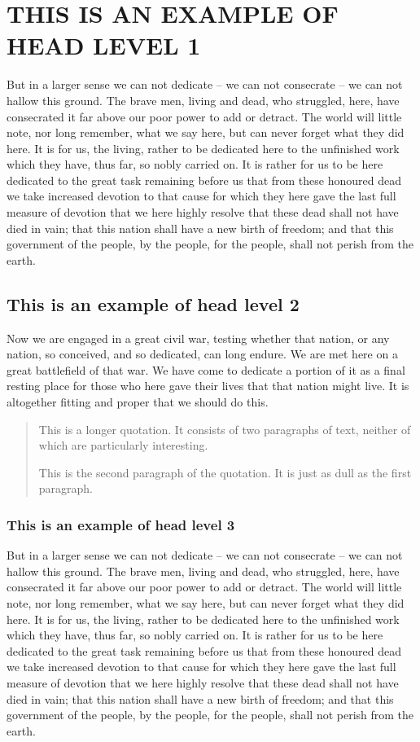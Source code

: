 \documentclass{pasa}%
\begin{document}
 
\section{THIS IS AN EXAMPLE OF HEAD LEVEL 1}
But in a larger sense we can not dedicate -- we can not consecrate -- we can not hallow this ground. The brave men, living and dead, who struggled, here, have consecrated it far above our poor power to add or detract. The world will little note, nor long remember, what we say here, but can never forget what they did here. It is for us, the living, rather to be dedicated here to the unfinished work which they have, thus far, so nobly carried on. It is rather for us to be here dedicated to the great task remaining before us  that from these honoured dead we take increased devotion to that cause for which they here gave the last full measure of devotion  that we here highly resolve that these dead shall not have died in vain; that this nation shall have a new birth of freedom; and that this government of the people, \cite{abt1979} by the people, for the people, shall not perish from the earth.

\subsection{This is an example of head level 2}
Now we are engaged in a great civil war, testing whether that nation, or any nation, so conceived, and so dedicated, can long endure. We are met here on a great battlefield of that war. We have come to dedicate a portion of it as a final resting place for those who here gave their lives that that nation might live. It is altogether fitting and proper that we should do this.

\begin{quotation}
This is a longer quotation. It consists of two paragraphs of text, neither of which are particularly interesting.

This is the second paragraph of the quotation. It is just as dull as the first paragraph.
\end{quotation} 

\subsubsection{This is an example of head level 3}
But in a larger sense we can not dedicate -- we can not consecrate -- we can not hallow this ground. The brave men, living and dead, who struggled, here, have consecrated it far above our poor power to add or detract. The world will little note, nor long remember, what we say here, but can never forget what they did here. It is for us, the living, rather to be dedicated here to the unfinished work which they have, thus far, so nobly carried on. It is rather for us to be here dedicated to the great task remaining before us  that from these honoured dead we take increased devotion to that cause for which they here gave the last full measure of devotion  that we here highly resolve that these dead shall not have died in vain; that this nation shall have a new birth of freedom; and that this government of the people, by the people, for the people, shall not perish from the earth.
\end{document}
